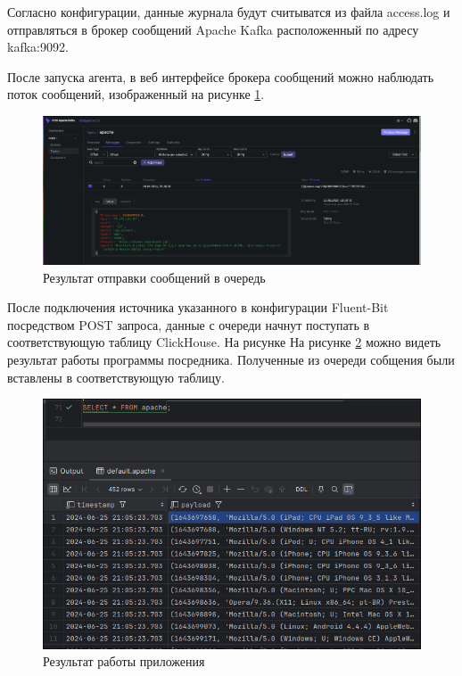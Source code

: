 \documentclass[14pt, russian]{scrartcl}
\begin{document}
Согласно конфигурации, данные журнала будут
считыватся из файла access.log и отправляться в
брокер сообщений Apache Kafka расположенный
по адресу kafka:9092.

После запуска агента, в веб интерфейсе
брокера сообщений можно наблюдать поток
сообщений, изображенный на рисунке \ref{fig:fluentmsgs}.

\begin{figure}[H]
	\centering
	\begin{minipage}[t]{.9\textwidth}
		\centering
		\includegraphics[width=.9\textwidth]{./imgs/msgs.png}
	\end{minipage}
	\caption{Результат отправки сообщений в очередь}
	\label{fig:fluentmsgs}
\end{figure}


После подключения источника указанного в конфигурации
Fluent-Bit посредством POST запроса, данные с очереди начнут
поступать в соответствующую таблицу ClickHouse. На рисунке
На рисунке \ref{fig:inserterresult} можно видеть результат работы программы
посредника. Полученные из очереди собщения были вставлены в соответствующую таблицу.

\begin{figure}[H]
	\centering
	\begin{minipage}[t]{.9\textwidth}
		\centering
		\includegraphics[width=.9\textwidth]{./imgs/inserterresult.png}
	\end{minipage}
	\caption{Результат работы приложения}
	\label{fig:inserterresult}
\end{figure}
\end{document}
